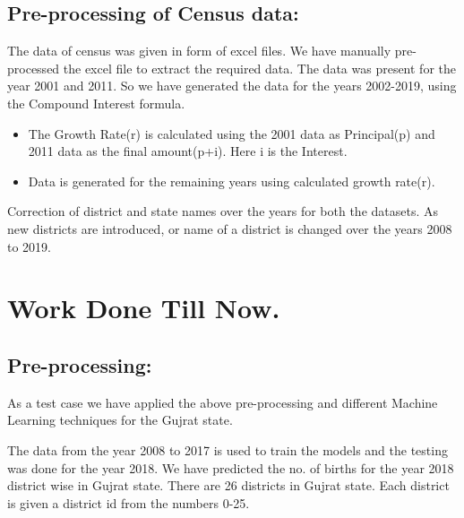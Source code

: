 \documentclass[]{article}
\begin{document}
\subsection{Pre-processing of Census data:}
The data of census was given in form of excel files. We have manually pre-processed the excel file to extract the required data. The data was present for the year 2001 and 2011. So we have generated the data for the years 2002-2019, using the Compound Interest formula.
\begin{itemize}
\item The Growth Rate(r) is calculated using the 2001 data as Principal(p) and 2011 data as the final amount(p+i). Here i is the Interest.
\item Data is generated for the remaining years using calculated growth rate(r).
\end{itemize}
Correction of district and state names over the years for both the datasets. As new districts are introduced, or name of a district is changed over the years 2008 to 2019.

\newpage

\section{Work Done Till Now.}
\subsection {Pre-processing: }
As a test case we have applied the above pre-processing and different Machine Learning techniques for the Gujrat state.

\bigskip

The data from the year 2008 to 2017 is used to train the models and the testing was done for the year 2018. We have predicted the no. of births for the year 2018 district wise in Gujrat state. There are 26 districts in Gujrat state. Each district is given a district id from the numbers 0-25. 

\bigskip
\end{document}
